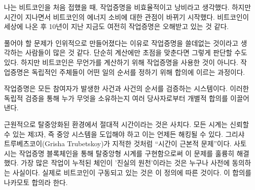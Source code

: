 \begin{comment}
	When I first learned how Bitcoin works I also thought that proof-of-work
	is inefficient and wasteful. After a while, I started to shift my
	perspective on Bitcoin's energy consumption~\cite{gigi:energy}. It seems that
	proof-of-work is still widely misunderstood today, in the year 10 AB
	(after Bitcoin).
\end{comment}
나는 비트코인을 처음 접했을 때, 작업증명을 비효율적이고 낭비라고 생각했다.
하지만 시간이 지나면서 비트코인의 에너지 소비\cite{gigi:energy}에 대한 관점이 바뀌기 시작했다.
비트코인이 세상에 나온 후 10년이 지난 지금도 여전히 작업증명은 오해받고 있는 것 같다.

\begin{comment}
	Since the problems to be solved in proof-of-work are made up, many
	people seem to believe that it is \textit{useless} work. If the focus is purely
	on the computation, this is an understandable conclusion. But Bitcoin
	isn't about computation. It is about \textit{independently agreeing on the
		order of things.}
\end{comment}
풀어야 할 문제가 인위적으로 만들어졌다는 이유로 작업증명을 쓸데없는 것이라고 생각하는 사람들이 많은 것 같다.
단순히 계산에만 초점을 맞춘다면 그렇게 판단할 수도 있다.
하지만 비트코인은 무언가를 계산하기 위해 작업증명을 사용한 것이 아니다.
작업증명은 독립적인 주체들이 어떤 일의 순서를 정하기 위해 합의에 이르는 과정이다.

\begin{comment}
	Proof-of-work is a system in which everyone can validate what happened
	and in what order it happened. This independent validation is what leads
	to consensus, an individual agreement by multiple parties about who owns
	what.
\end{comment}
작업증명은 모든 참여자가 발생한 사건과 사건의 순서를 검증하는 시스템이다.
이러한 독립적 검증을 통해 누가 무엇을 소유하는지 여러 당사자로부터 개별적 합의를 이끌어낸다. 

\begin{comment}
	In a radically decentralized environment, we don't have the luxury of absolute
	time. Any clock would introduce a trusted third party, a central point in the
	system which had to be relied upon and could be attacked. \enquote{Timing is the root
		problem,} as Grisha Trubetskoy points out~\cite{pow-clock}. And Satoshi
	brilliantly solved this problem by implementing a decentralized clock via a
	proof-of-work blockchain. Everyone agrees beforehand that the chain with the
	most cumulative work is the source of truth. It is per definition what actually
	happened. This agreement is what is now known as Nakamoto consensus.
\end{comment}
근원적으로 탈중앙화된 환경에서 절대적 시간이라는 것은 사치다.
모든 시계는 신뢰할 수 있는 제3자, 즉 중앙 시스템을 도입해야 하고 이는 언제든 해킹될 수 있다.
그리샤 트루베츠코이(Grisha Trubetskoy)가 지적한 것처럼 \enquote{시간이 근본적 문제}이다.\cite{pow-clock}
사토시는 작업증명 블록체인을 통해 탈중앙형 시계를 구현함으로써 이 문제를 훌륭히 해결했다.
가장 많은 작업이 누적된 체인이 '진실의 원천'이라는 것은 누구나 사전에 동의하는 사실이다.
실제로 비트코인이 구동되고 있는 것은 이 정의에 따른 것이다.
이 합의를 나카모토 합의라 한다.

